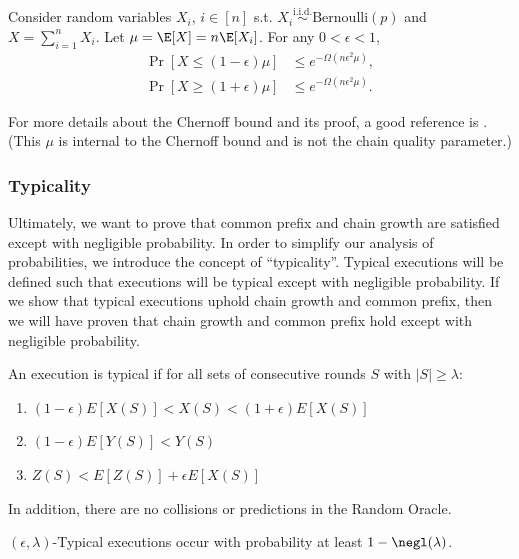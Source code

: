 \begin{theorem}
Consider random variables ${X_i}$, ${i\in [n]}$ s.t. $X_i \overset{\text{i.i.d.}}{\sim} \mathrm{Bernoulli}(p)$ and $X = \sum_{i=1}^{n} X_i$. Let $\mu = \E[X] = n \E[X_i]$. For any $0 < \epsilon < 1$,
\begin{align}
    \Pr[X \leq (1 - \epsilon) \mu ] &\leq e^{-\Omega(n\epsilon^2\mu)}, \\
    \Pr[X \geq (1 + \epsilon) \mu ] &\leq e^{-\Omega(n\epsilon^2\mu)}.
\end{align}
\end{theorem}
For more details about the Chernoff bound and its proof, a good reference is \cite{chernoff1952measure}.
(This $\mu$ is internal to the Chernoff bound and is not the chain quality parameter.)


\subsubsection{Typicality}

Ultimately, we want to prove that common prefix and chain growth are satisfied except with negligible probability. In order to simplify our analysis of probabilities, we introduce the concept of ``typicality''. Typical executions will be defined such that executions will be typical except with negligible probability. If we show that typical executions uphold chain growth and common prefix, then we will have proven that chain growth and common prefix hold except with negligible probability.

\begin{definition}
An execution is typical if for all sets of consecutive rounds $S$ with $|S| \geq \lambda$:
\begin{enumerate}
    \item $(1-\epsilon) E[X(S)] < X(S) < (1+\epsilon) E[X(S)]$
    \item $(1-\epsilon) E[Y(S)] < Y(S) $
    \item $ Z(S) < E[Z(S)] + \epsilon E[X(S)] $
\end{enumerate}
In addition, there are no collisions or predictions in the Random Oracle.
\end{definition}

\begin{theorem}
$(\epsilon,\lambda)$-Typical executions occur with probability at least $1-\negl(\lambda)$.
\end{theorem}

